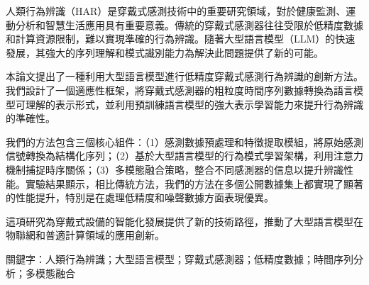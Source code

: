 人類行為辨識（HAR）是穿戴式感測技術中的重要研究領域，對於健康監測、運動分析和智慧生活應用具有重要意義。傳統的穿戴式感測器往往受限於低精度數據和計算資源限制，難以實現準確的行為辨識。隨著大型語言模型（LLM）的快速發展，其強大的序列理解和模式識別能力為解決此問題提供了新的可能。

本論文提出了一種利用大型語言模型進行低精度穿戴式感測行為辨識的創新方法。我們設計了一個適應性框架，將穿戴式感測器的粗粒度時間序列數據轉換為語言模型可理解的表示形式，並利用預訓練語言模型的強大表示學習能力來提升行為辨識的準確性。

我們的方法包含三個核心組件：（1）感測數據預處理和特徵提取模組，將原始感測信號轉換為結構化序列；（2）基於大型語言模型的行為模式學習架構，利用注意力機制捕捉時序關係；（3）多模態融合策略，整合不同感測器的信息以提升辨識性能。實驗結果顯示，相比傳統方法，我們的方法在多個公開數據集上都實現了顯著的性能提升，特別是在處理低精度和噪聲數據方面表現優異。

這項研究為穿戴式設備的智能化發展提供了新的技術路徑，推動了大型語言模型在物聯網和普適計算領域的應用創新。

關鍵字：人類行為辨識；大型語言模型；穿戴式感測器；低精度數據；時間序列分析；多模態融合